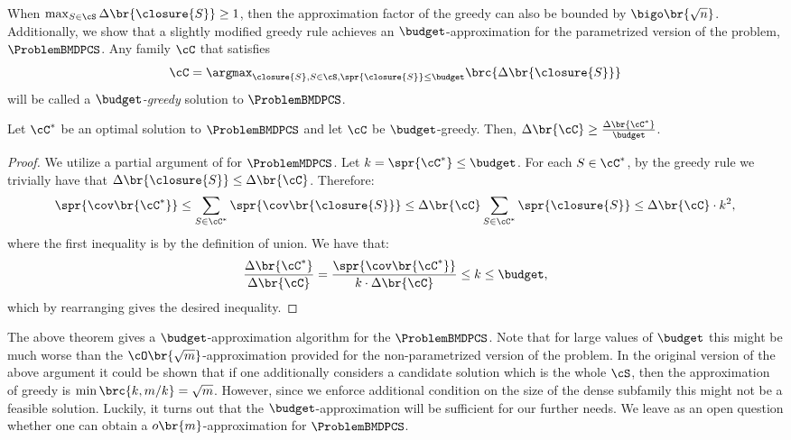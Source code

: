 When $\max_{S \in \cS} \Delta\br{\closure{S}} \geq 1$, then the approximation factor of the greedy can also be bounded by $\bigo\br{\sqrt{n}}$.
Additionally, we show that a slightly modified greedy rule achieves an $\budget$-approximation for the parametrized version of the problem, $\ProblemBMDPCS$.
Any family $\cC$ that satisfies
    \[
    \cC=\argmax_{\closure{S}, S \in \cS, \spr{\closure{S}}\leq \budget} \brc{\Delta\br{\closure{S}}}
    \]
will be called a \emph{$\budget$-greedy} solution to $\ProblemBMDPCS$.
\begin{theorem}\label{thm:BMDPCS-greedy}
    Let $\cC^*$ be an optimal solution to $\ProblemBMDPCS$ and let $\cC$ be $\budget$-greedy.
    Then, $\Delta\br{\cC} \geq \frac{\Delta\br{\cC^*}}{\budget}$.
\end{theorem}
\begin{proof}
    We utilize a partial argument of \cite{PCMSSC} for $\ProblemMDPCS$. Let $k=\spr{\cC^*}\leq \budget$.
    For each $S\in \cC^*$, by the greedy rule we trivially have that $\Delta\br{\closure{S}}\leq \Delta\br{\cC}$.
    Therefore:
    \[
    \spr{\cov\br{\cC^*}} \leq \sum_{S\in\cC^*}\spr{\cov\br{\closure{S}}}\leq \Delta\br{\cC}\sum_{S\in\cC^*} \spr{\closure{S}} \leq \Delta\br{\cC} \cdot k^2,
    \]
    where the first inequality is by the definition of union. We have that:
    \[
    \frac{\Delta\br{\cC^*}}{\Delta\br{\cC}}=\frac{\spr{\cov\br{\cC^*}}}{k\cdot\Delta\br{\cC}}\leq k\leq \budget,
    \]
    which by rearranging gives the desired inequality.
\end{proof}
The above theorem gives a $\budget$-approximation algorithm for the $\ProblemBMDPCS$. Note that for large values of $\budget$ this might be much worse than the $\cO\br{\sqrt{m}}$-approximation provided for the non-parametrized version of the problem. In the original version of the above argument it could be shown that if one additionally considers a candidate solution which is the whole $\cS$, then the approximation of greedy is $\min\brc{k, m/k}=\sqrt{m}$. However, since we enforce additional condition on the size of the dense subfamily this might not be a feasible solution. Luckily, it turns out that the $\budget$-approximation will be sufficient for our further needs. We leave as an open question whether one can obtain a $o\br{m}$-approximation for $\ProblemBMDPCS$.



